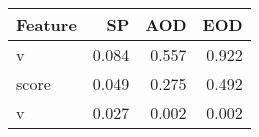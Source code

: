 \begin{tabular}{lrrr}
\toprule
Feature & SP & AOD & EOD \\
\midrule
v & 0.084 & 0.557 & 0.922 \\
score & 0.049 & 0.275 & 0.492 \\
v & 0.027 & 0.002 & 0.002 \\
\bottomrule
\end{tabular}
